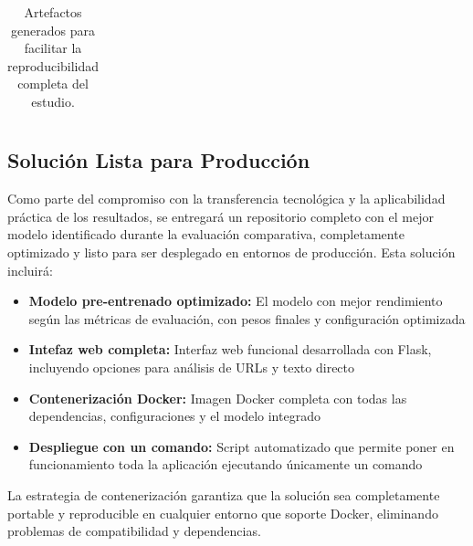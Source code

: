 \begin{table}[htbp]
{\begin{tabular}{|l|l|l|l|}
\hline
\end{tabular}
}
\caption{Artefactos generados para facilitar la reproducibilidad completa del estudio.}
\label{tab:artefactos_reproducibilidad}
\end{table}

\subsection{Solución Lista para Producción}

Como parte del compromiso con la transferencia tecnológica y la aplicabilidad práctica de los resultados, se entregará un repositorio completo con el mejor modelo identificado durante la evaluación comparativa, completamente optimizado y listo para ser desplegado en entornos de producción. Esta solución incluirá:

\begin{itemize}
    \item \textbf{Modelo pre-entrenado optimizado:} El modelo con mejor rendimiento según las métricas de evaluación, con pesos finales y configuración optimizada
    \item \textbf{Intefaz web completa:} Interfaz web funcional desarrollada con Flask, incluyendo opciones para análisis de URLs y texto directo
    \item \textbf{Contenerización Docker:} Imagen Docker completa con todas las dependencias, configuraciones y el modelo integrado
    \item \textbf{Despliegue con un comando:} Script automatizado que permite poner en funcionamiento toda la aplicación ejecutando únicamente un comando
\end{itemize}

La estrategia de contenerización garantiza que la solución sea completamente portable y reproducible en cualquier entorno que soporte Docker, eliminando problemas de compatibilidad y dependencias. 
